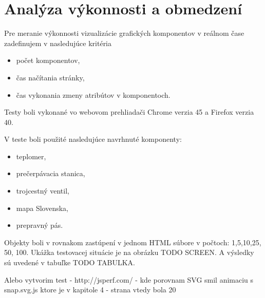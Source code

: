 \chapter{Analýza výkonnosti a obmedzení }
Pre meranie výkonnosti vizualizácie grafických komponentov v reálnom čase zadefinujem v nasledujúce kritéria
\begin{itemize}
	\item počet komponentov, 
	\item čas načítania stránky, 
	\item čas vykonania zmeny atribútov v komponentoch.
\end{itemize}

Testy boli vykonané vo webovom prehliadači Chrome verzia 45 a Firefox verzia 40.  

V teste boli použité nasledujúce navrhnuté komponenty:
\begin{itemize}
	\item teplomer, 
	\item prečerpávacia stanica, 
	\item trojcestný ventil, 
	\item mapa Slovenska, 
	\item prepravný pás. 
\end{itemize}

Objekty boli v rovnakom zastúpení v jednom HTML súbore  v počtoch: 1,5,10,25, 50, 100.
Ukážka testovacej situácie je na obrázku TODO SCREEN. 
A výsledky sú uvedené v tabuľke TODO TABULKA. 


\newpage
Alebo vytvorim test -
http://jsperf.com/
- kde porovnam SVG smil animaciu s snap.svg.js
ktore je v kapitole 4 - strana vtedy bola 20

